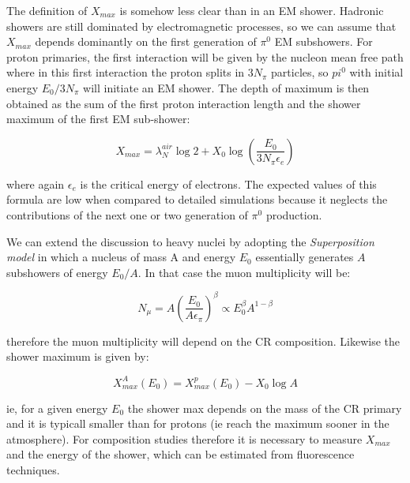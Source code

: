 \documentclass[
  letterpaper,
  DIV=11,
  numbers=noendperiod]{scrreprt}
\begin{document}
The definition of \(X_{max}\) is somehow less clear than in an EM
shower. Hadronic showers are still dominated by electromagnetic
processes, so we can assume that \(X_{max}\) depends dominantly on the
first generation of \(\pi^0\) EM subshowers. For proton primaries, the
first interaction will be given by the nucleon mean free path where in
this first interaction the proton splits in \(3N_\pi\) particles, so
\(pi^0\) with initial energy \(E_0/3N_\pi\) will initiate an EM shower.
The depth of maximum is then obtained as the sum of the first proton
interaction length and the shower maximum of the first EM sub-shower:

\[X_{max} = \lambda^{air}_N \log2 + X_0 \log\left(\frac{E_0}{3N_\pi\epsilon_e}\right) \]

where again \(\epsilon_e\) is the critical energy of electrons. The
expected values of this formula are low when compared to detailed
simulations because it neglects the contributions of the next one or two
generation of \(\pi^0\) production.

\begin{tcolorbox}[enhanced jigsaw, colframe=quarto-callout-note-color-frame, leftrule=.75mm, left=2mm, opacitybacktitle=0.6, colbacktitle=quarto-callout-note-color!10!white, coltitle=black, arc=.35mm, titlerule=0mm, toprule=.15mm, opacityback=0, bottomrule=.15mm, breakable, bottomtitle=1mm, rightrule=.15mm, toptitle=1mm, colback=white, title=\textcolor{quarto-callout-note-color}{\faInfo}\hspace{0.5em}{Superposition model for heavy nuclei air showers}]

We can extend the discussion to heavy nuclei by adopting the
\emph{Superposition model} in which a nucleus of mass A and energy
\(E_0\) essentially generates \(A\) subshowers of energy \(E_0/A\). In
that case the muon multiplicity will be:

\[N_\mu = A \left(\frac{E_0}{A\epsilon_\pi}\right)^\beta \propto E_0^\beta A^{1 - \beta} \]

therefore the muon multiplicity will depend on the CR composition.
Likewise the shower maximum is given by:

\[X^{A}_{max}(E_0) = X_{max}^{p}(E_0) - X_0\log{A}\]

ie, for a given energy \(E_0\) the shower max depends on the mass of the
CR primary and it is typicall smaller than for protons (ie reach the
maximum sooner in the atmosphere). For composition studies therefore it
is necessary to measure \(X_{max}\) and the energy of the shower, which
can be estimated from fluorescence techniques.

\end{tcolorbox}
\end{document}
